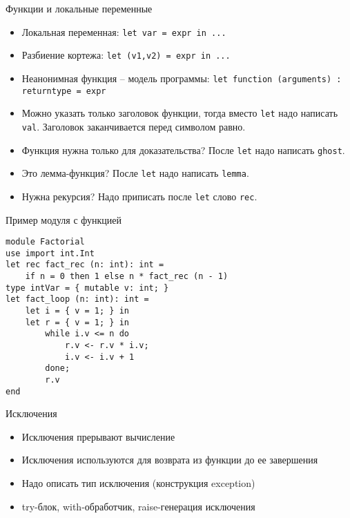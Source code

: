 \documentclass[hyperref={unicode=true}]{beamer}
\begin{document}
    \begin{frame}{Функции и локальные переменные}
    \begin{itemize}
    \item
    Локальная переменная: \texttt{let var = expr in ... }
    \item
    Разбиение кортежа: \texttt{let (v1,v2) = expr in ... }
    \item
    Неанонимная функция -- модель программы:
    \texttt{let function (arguments) : returntype = expr}
    \item
    Можно указать только заголовок функции, тогда вместо \texttt{let}
    надо написать \texttt{val}. Заголовок заканчивается перед
    символом равно.
    \item
    Функция нужна только для доказательства? После \texttt{let}
    надо написать \texttt{ghost}.
    \item
    Это лемма-функция? После \texttt{let}
    надо написать \texttt{lemma}.
    \item
    Нужна рекурсия? Надо приписать после \texttt{let}
    слово \texttt{rec}.
    \end{itemize}
    \end{frame}

    \begin{frame}[fragile]{Пример модуля с функцией}
    \begin{lstlisting}
module Factorial
use import int.Int
let rec fact_rec (n: int): int =
    if n = 0 then 1 else n * fact_rec (n - 1)
type intVar = { mutable v: int; }
let fact_loop (n: int): int =
    let i = { v = 1; } in
    let r = { v = 1; } in
        while i.v <= n do
            r.v <- r.v * i.v;
            i.v <- i.v + 1
        done;
        r.v
end
    \end{lstlisting}
    \end{frame}


    \begin{frame}{Исключения}
    \begin{itemize}
    \item
    Исключения прерывают вычисление
    \item
    Исключения используются для возврата из функции до ее завершения
    \item
    Надо описать тип исключения (конструкция exception)
    \item
    try-блок, with-обработчик, raise-генерация исключения
    \end{itemize}
    \end{frame}
\end{document}
